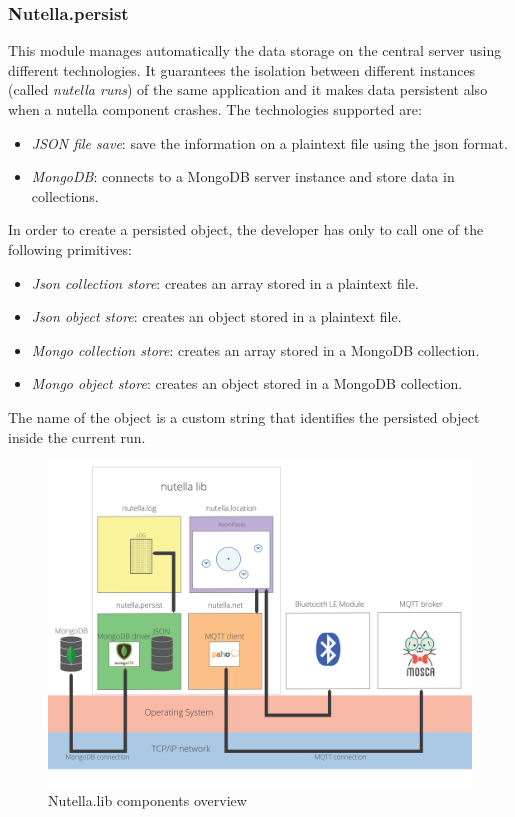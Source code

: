 \subsubsection{Nutella.persist}
This module manages automatically the data storage on the central server using different technologies. It guarantees the isolation between different instances (called \textit{nutella runs}) of the same application and it makes data persistent also when a nutella component crashes. The technologies supported are:
\begin{itemize}
\item \textit{JSON file save}: save the information on a plaintext file using the json format.
\item \textit{MongoDB}: connects to a MongoDB server instance and store data in collections.
\end{itemize}
In order to create a persisted object, the developer has only to call one of the following primitives:
\begin{itemize}
    \item \textit{Json collection store}: creates an array stored in a plaintext file.
    \item \textit{Json object store}: creates an object stored in a plaintext file.
    \item \textit{Mongo collection store}: creates an array stored in a MongoDB collection.
    \item \textit{Mongo object store}: creates an object stored in a MongoDB collection.
\end{itemize}
The name of the object is a custom string that identifies the persisted object inside the current run.

\begin{figure}
\centering
\includegraphics[width=6in]{images/nutella-overview.png}
\caption{Nutella.lib components overview}
\label{fig:nutella_overview}
\end{figure}


